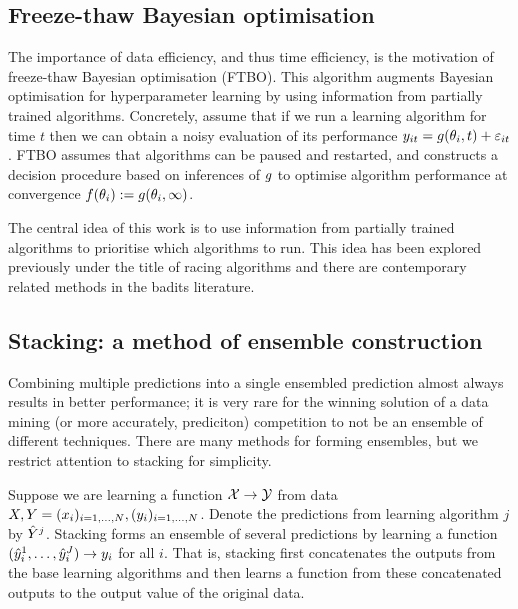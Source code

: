 \documentclass{article} %
\begin{document}

\subsection{Freeze-thaw Bayesian optimisation}

The importance of data efficiency, and thus time efficiency, is the motivation of freeze-thaw Bayesian optimisation (FTBO).
This algorithm augments Bayesian optimisation for hyperparameter learning by using information from partially trained algorithms.
Concretely, assume that if we run a learning algorithm for time $t$ then we can obtain a noisy evaluation of its performance ${y_{it} = g(\theta_i, t) + \varepsilon_{it}}$.
FTBO assumes that algorithms can be paused and restarted, and constructs a decision procedure based on inferences of $g$ to optimise algorithm performance at convergence \ie ${f(\theta_i) := g(\theta_i, \infty)}$.

The central idea of this work is to use information from partially trained algorithms to prioritise which algorithms to run.
This idea has been explored previously under the title of racing algorithms and there are contemporary related methods in the badits literature.

\subsection{Stacking: a method of ensemble construction}

Combining multiple predictions into a single ensembled prediction almost always results in better performance; it is very rare for the winning solution of a data mining (or more accurately, prediciton) competition to not be an ensemble of different techniques.
There are many methods for forming ensembles, but we restrict attention to stacking for simplicity.

Suppose we are learning a function ${\mathcal{X} \to \mathcal{Y}}$ from data ${X, Y = (x_i)_{i=1,\dots,N}, (y_i)_{i=1,\dots,N}}$.
Denote the predictions\footnotemark{} from learning algorithm $j$ by $\hat{Y}^j$.
Stacking forms an ensemble of several predictions by learning a function ${(\hat{y}_i^1,\dots,\hat{y}_i^J) \to y_i}$ for all $i$.
That is, stacking first concatenates the outputs from the base learning algorithms and then learns a function from these concatenated outputs to the output value of the original data.
\end{document}
